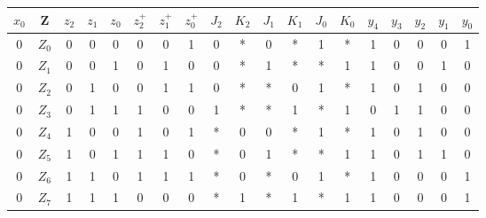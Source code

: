 \documentclass[11pt,a4paper]{article}
\begin{document}
\begin{tabular}{c | c | c | c | c | | c | c | c | | c | c | c | c | c | c | | c | c | c | c | c}
$x_0$&Z&$z_2$&$z_1$&$z_0$&$z^+_2$&$z^+_1$&$z^+_0$&$J_2$&$K_2$&$J_1$&$K_1$&$J_0$&$K_0$&$y_4$&$y_3$&$y_2$&$y_1$&$y_0$ \\ \hline
0&$Z_0$&0&0&0&0&0&1&0&*&0&*&1&*&1&0&0&0&1\\
0&$Z_1$&0&0&1&0&1&0&0&*&1&*&*&1&1&0&0&1&0\\
0&$Z_2$&0&1&0&0&1&1&0&*&*&0&1&*&1&0&1&0&0\\
0&$Z_3$&0&1&1&1&0&0&1&*&*&1&*&1&0&1&1&0&0\\
0&$Z_4$&1&0&0&1&0&1&*&0&0&*&1&*&1&0&1&0&0\\
0&$Z_5$&1&0&1&1&1&0&*&0&1&*&*&1&1&0&1&1&0\\
0&$Z_6$&1&1&0&1&1&1&*&0&*&0&1&*&1&0&0&0&1\\
0&$Z_7$&1&1&1&0&0&0&*&1&*&1&*&1&1&0&0&0&1\\ \hline

\end{tabular}\\
\end{document}
